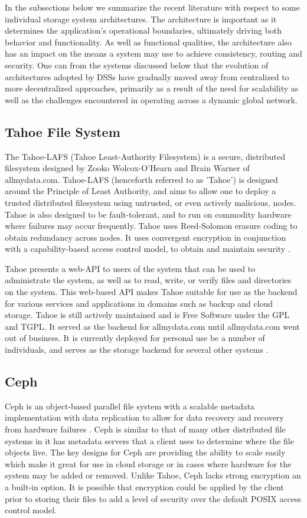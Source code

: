 \documentclass[11pt]{article}
\begin{document}
In the subsections below we summarize the recent literature with
respect to some individual storage system architectures. The
architecture is important as it determines the application’s
operational boundaries, ultimately driving both behavior and
functionality. As well as functional qualities, the architecture also
has an impact on the means a system may use to achieve consistency,
routing and security. One can from the systems discussed below that
the evolution of architectures adopted by DSSs have gradually moved
away from centralized to more decentralized approaches, primarily as a
result of the need for scalability as well as the challenges
encountered in operating across a dynamic global network.


\subsection{Tahoe File System}
The Tahoe-LAFS (Tahoe Least-Authority Filesystem) is a secure,
distributed filesystem designed by Zooko Wolcox-O'Hearn and Brain
Warner of allmydata.com. Tahoe-LAFS (henceforth referred to as
'Tahoe') is designed around the Principle of Least Authority, and aims
to allow one to deploy a trusted distributed filesystem using
untrusted, or even actively malicious, nodes. Tahoe is also designed
to be fault-tolerant, and to run on commodity hardware where failures
may occur frequently. Tahoe uses Reed-Solomon erasure coding to obtain
redundancy across nodes. It uses convergent encryption in conjunction
with a capability-based access control model, to obtain and maintain
security \cite{WilcoxOHearn:2008p1275}.

Tahoe presents a web-API to users of the system that can be used to
administrate the system, as well as to read, write, or verify files
and directories on the system. This web-based API makes Tahoe suitable
for use as the backend for various services and applications in
domains such as backup and cloud storage. Tahoe is still actively
maintained and is Free Software under the GPL and TGPL. It served as
the backend for allmydata.com until allmydata.com went out of
business. It is currently deployed for personal use be a number of
individuals, and serves as the storage backend for several other
systems \cite{tahoe-lafs.org}.

\subsection{Ceph}
Ceph is an object-based parallel file system with a scalable metadata
implementation with data replication to allow for data recovery and
recovery from hardware failures
\cite{Weil:2012p1035,Weil:2012p1010,Weil:2006p1273}.
Ceph is similar to that of many other distributed file systems in it 
has metadata servers that a client uses to determine where the file 
objects live. The key designs for Ceph are providing the ability to 
scale easily which make it great for use in cloud storage or in cases 
where hardware for the system may be added or removed. Unlike Tahoe, 
Ceph lacks strong encryption an a built-in option. It is possible that 
encryption could be applied by the client prior to storing their files 
to add a level of security over the default POSIX access control model.
\end{document}
